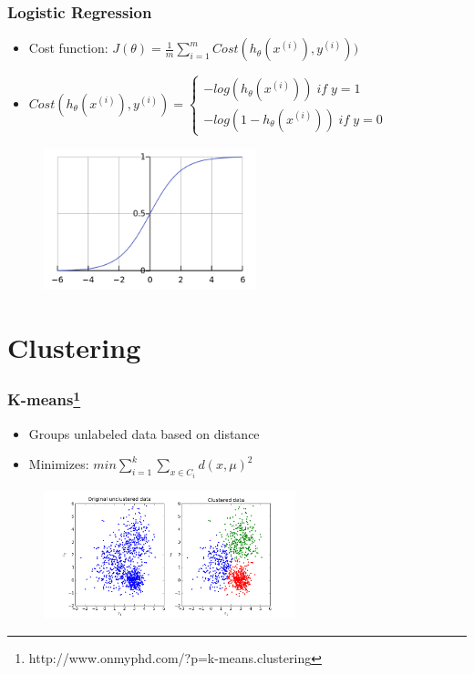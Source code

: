 \documentclass{beamer}
\begin{document}
\begin{frame}
	\frametitle{Logistic Regression}
	\begin{itemize}
		\item Cost function: $J(\theta) = \frac{1}{m}\sum_{i=1}^{m}Cost(h_{\theta}(x^{(i)}),y^{(i)}))$
		\item $Cost(h_{\theta}(x^{(i)}),y^{(i)}) = \left\{\begin{matrix}
		-log(h_{\theta}(x^{(i)}))\; if\; y=1\\ 
		-log(1-h_{\theta}(x^{(i)}))\; if\; y=0
		\end{matrix}\right.$
	\end{itemize}
	\begin{figure}
		\centering
		\includegraphics[keepaspectratio, width=0.55\textwidth]{graphics/sigmoid}
	\end{figure}
\end{frame}

\section{Clustering}
\begin{frame}
	\frametitle{K-means\footnote[frame]{http://www.onmyphd.com/?p=k-means.clustering}}
	\begin{itemize}
		\item Groups unlabeled data based on distance
		\item Minimizes: $min \sum_{i=1}^{k}\sum_{x \in C_{i}}  d(x, \mu)^{2}$
	\end{itemize}
	\begin{figure}
		\centering
		\includegraphics[keepaspectratio, width=0.65\textwidth]{graphics/kmeans_2d}
	\end{figure}
\end{frame}
\end{document}
